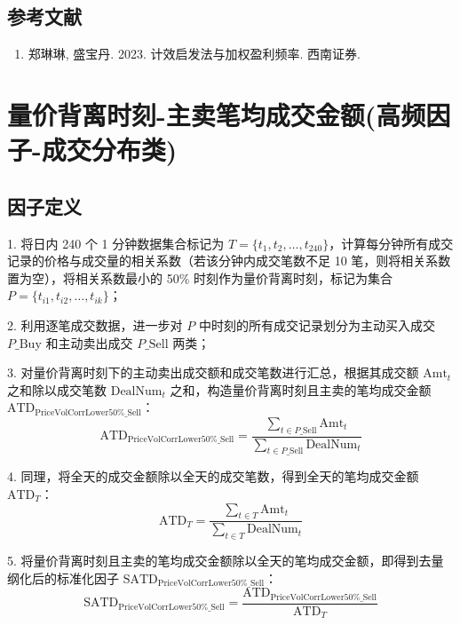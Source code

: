 \documentclass{article}
\begin{document}
\subsection{参考文献}
\begin{enumerate}
    \item 郑琳琳, 盛宝丹. 2023. 计效启发法与加权盈利频率. 西南证券.
\end{enumerate}

\section{量价背离时刻-主卖笔均成交金额(高频因子-成交分布类)}

\subsection{因子定义}

1. 将日内 240 个 1 分钟数据集合标记为 \( T = \{t_1, t_2, \dots, t_{240}\} \)，计算每分钟所有成交记录的价格与成交量的相关系数（若该分钟内成交笔数不足 10 笔，则将相关系数置为空），将相关系数最小的 50\% 时刻作为量价背离时刻，标记为集合 \( P = \{t_{i1}, t_{i2}, \dots, t_{ik}\} \)；

2. 利用逐笔成交数据，进一步对 \( P \) 中时刻的所有成交记录划分为主动买入成交 \( P\_\mathrm{Buy} \) 和主动卖出成交 \( P\_\mathrm{Sell} \) 两类；

3. 对量价背离时刻下的主动卖出成交额和成交笔数进行汇总，根据其成交额 \( \mathrm{Amt}_t \) 之和除以成交笔数 \( \mathrm{DealNum}_t \) 之和，构造量价背离时刻且主卖的笔均成交金额 \( \mathrm{ATD}_{\mathrm{PriceVolCorrLower50\%\_Sell}} \)：
\begin{equation}
    \mathrm{ATD}_{\mathrm{PriceVolCorrLower50\%\_Sell}} = \frac{\sum_{t \in P\_\mathrm{Sell}} \mathrm{Amt}_t}{\sum_{t \in P\_\mathrm{Sell}} \mathrm{DealNum}_t}
\end{equation}

4. 同理，将全天的成交金额除以全天的成交笔数，得到全天的笔均成交金额 \( \mathrm{ATD}_T \)：
\begin{equation}
    \mathrm{ATD}_T = \frac{\sum_{t \in T} \mathrm{Amt}_t}{\sum_{t \in T} \mathrm{DealNum}_t}
\end{equation}

5. 将量价背离时刻且主卖的笔均成交金额除以全天的笔均成交金额，即得到去量纲化后的标准化因子 \( \mathrm{SATD}_{\mathrm{PriceVolCorrLower50\%\_Sell}} \)：
\begin{equation}
    \mathrm{SATD}_{\mathrm{PriceVolCorrLower50\%\_Sell}} = \frac{\mathrm{ATD}_{\mathrm{PriceVolCorrLower50\%\_Sell}}}{\mathrm{ATD}_T}
\end{equation}
\end{document}
